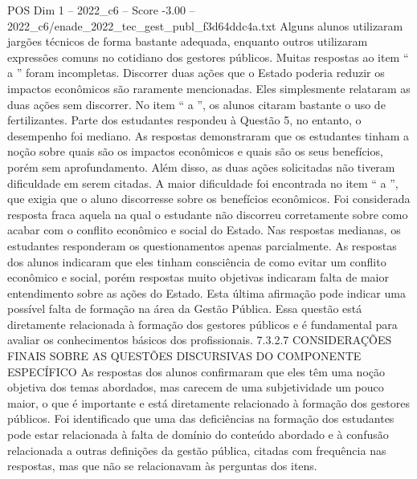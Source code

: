 \begin{textsample}{POS Dim 1 – 2022\_c6 – Score -3.00 – 2022\_c6/enade\_2022\_tec\_gest\_publ\_f3d64ddc4a.txt}
Alguns alunos utilizaram jargões técnicos de forma bastante adequada, enquanto outros utilizaram expressões comuns no cotidiano dos gestores públicos.
Muitas respostas ao item “ a ” foram incompletas.
Discorrer duas ações que o Estado poderia reduzir os impactos econômicos são raramente mencionadas.
Eles simplesmente relataram as duas ações sem discorrer.
No item “ a ”, os alunos citaram bastante o uso de fertilizantes.
Parte dos estudantes respondeu à Questão 5, no entanto, o desempenho foi mediano.
As respostas demonstraram que os estudantes tinham a noção sobre quais são os impactos econômicos e quais são os seus benefícios, porém sem aprofundamento.
Além disso, as duas ações solicitadas não tiveram dificuldade em serem citadas.
A maior dificuldade foi encontrada no item “ a ”, que exigia que o aluno discorresse sobre os benefícios econômicos.
Foi considerada resposta fraca aquela na qual o estudante não discorreu corretamente sobre como acabar com o conflito econômico e social do Estado.
Nas respostas medianas, os estudantes responderam os questionamentos apenas parcialmente.
As respostas dos alunos indicaram que eles tinham consciência de como evitar um conflito econômico e social, porém respostas muito objetivas indicaram falta de maior entendimento sobre as ações do Estado.
Esta última afirmação pode indicar uma possível falta de formação na área da Gestão Pública.
Essa questão está diretamente relacionada à formação dos gestores públicos e é fundamental para avaliar os conhecimentos básicos dos profissionais. 7.3.2.7 CONSIDERAÇÕES FINAIS SOBRE AS QUESTÕES DISCURSIVAS DO COMPONENTE ESPECÍFICO As respostas dos alunos confirmaram que eles têm uma noção objetiva dos temas abordados, mas carecem de uma subjetividade um pouco maior, o que é importante e está diretamente relacionado à formação dos gestores públicos.
Foi identificado que uma das deficiências na formação dos estudantes pode estar relacionada à falta de domínio do conteúdo abordado e à confusão relacionada a outras definições da gestão pública, citadas com frequência nas respostas, mas que não se relacionavam às perguntas dos itens.

\end{textsample}
